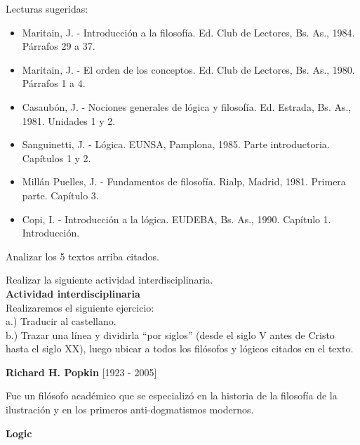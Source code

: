 \documentclass{article}
\begin{document}
\noindent Lecturas sugeridas:
\begin{itemize}[label={$\bullet$}]
    \item Maritain, J. - Introducción a la filosofía. Ed. Club de Lectores, Bs. As., 1984. Párrafos 29 a 37.
    \item Maritain, J. - El orden de los conceptos. Ed. Club de Lectores, Bs. As., 1980. Párrafos 1 a 4.
    \item Casaubón, J. - Nociones generales de lógica y filosofía. Ed. Estrada, Bs. As., 1981. Unidades 1 y 2.
    \item Sanguinetti, J. - Lógica. EUNSA, Pamplona, 1985. Parte introductoria. Capítulos 1 y 2.
    \item Millán Puelles, J. - Fundamentos de filosofía. Rialp, Madrid, 1981. Primera parte. Capítulo 3.
    \item Copi, I. - Introducción a la lógica. EUDEBA, Bs. As., 1990. Capítulo 1. Introducción. 
\end{itemize}
    
\newpage
    
    \noindent Analizar los 5 textos arriba citados.
    
    \noindent Realizar la siguiente actividad interdisciplinaria. \\
    
    \noindent \textbf{Actividad interdisciplinaria} \\
    
    \noindent Realizaremos el siguiente ejercicio: \\
    \indent a.) Traducir al castellano. \\
    \indent b.) Trazar una línea y dividirla ``por siglos'' (desde el siglo V antes de Cristo hasta el siglo XX), luego ubicar a todos los filósofos y lógicos citados en el texto. 
    
    
    
\begin{center}
        \large{\textbf{Richard H. Popkin} [1923 - 2005]}
    \end{center}

    Fue un filósofo académico que se especializó en la historia de la filosofía de la ilustración y en los primeros anti-dogmatismos modernos. \par
    
    \begin{center}
        \large\textbf{{Logic}} 
    \end{center}
    
\end{document}

